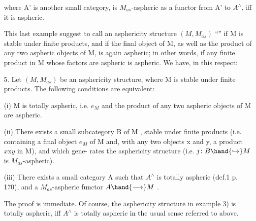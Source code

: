 
where A' is another small category,  is $M_{as}$-aspheric  as a functor from
 A' to $A^{\wedge}$, iff it is aspheric.

This last example suggest to call an asphericity structure $(M,M_{as})$
  ``\hand{\uline{\textcolor{black}{totally aspheric}}}''  if M is stable under finite products,
and if the final object of M,  as well as the product of any two aspheric
objects of M,  is again aspheric;  in other words,  if any finite product
in M whose factors are aspheric is aspheric.  We have,  in this respect:

\hand{\uline{\textcolor{black}{Proposition}}} 5.  Let $(M,M_{as})$ be an asphericity structure,  
where M is stable under finite products.  The following conditions are
equivalent:

(i)  M is totally aspheric,  i.e. $e_M$  and the product of any two
aspheric objects of M are aspheric.

(ii)  There exists a small  subcategory B of M ,  stable
under finite products (i.e. containing a final object $e_M$ of M and,  with
any two objects x and y,  a product  $x \mathrm{x} y$  in M),  and which  gene-%
rates the asphericity structure  (i.e.  $j\colon B\hand{\hookrightarrow} M$  is $M_{as}$-aspheric).

(iii)  There exists a  small category A such that $A^{\wedge}$ is totally
aspheric (def.1  p. 170),  and a $M_{as}$-aspheric functor  $A \hand{\longrightarrow} M$ .

\margin{$\uparrow$}The proof is immediate.  Of course,  the asphericity structure in
example 3)  is totally aspheric,  iff $A^{\wedge}$ is totally aspheric in the usual
sense referred to above.

